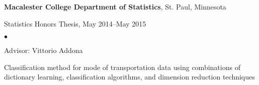\documentclass[margin,centered]{res}
\newenvironment{list1}{
  \begin{list}{\ding{113}}{%
      \setlength{\itemsep}{0in}
      \setlength{\parsep}{0in} \setlength{\parskip}{0in}
      \setlength{\topsep}{0in} \setlength{\partopsep}{0in}
      \setlength{\leftmargin}{0.17in}}}{\end{list}}
\newenvironment{list2}{
  \begin{list}{$\bullet$}{%
      \setlength{\itemsep}{0in}
      \setlength{\parsep}{0in} \setlength{\parskip}{0in}
      \setlength{\topsep}{0in} \setlength{\partopsep}{0in}
      \setlength{\leftmargin}{0.2in}}}{\end{list}}
\begin{document}
\begin{resume}
{\bf Macalester College Department of Statistics}, St. Paul, Minnesota
\begin{list1}
\item[] 
Statistics Honors Thesis, May 2014--May 2015
\begin{list2}
\vspace*{.05in}
\item
Advisor: Vittorio Addona
\item Classification method for mode of transportation data using combinations of dictionary learning, classification algorithms, and dimension reduction techniques
\end{list2} 
\end{list1}


\begin{comment}
{\bf Institute for Mathematics and Its Applications}, Minneapolis, Minnesota
\begin{list1}
\item[] 
Research Assistant, May 2014--July 2014
\begin{list2}
\vspace*{.05in}
\item
 Developed a model to automatically predict mode of transportation using smartphone sensor data
 \item Manipulated, cleaned, and visualized large time-series data sets in R
\item Contributed random forest methods of final model to Android smartphone application
 \item Presented research findings biweekly, created research poster and paper
\end{list2} 
\end{list1}


{\bf Center for Khmer Studies}, Siem Reap, Cambodia
\begin{list1}
\item[] 
Undergraduate Research Fellow, June 2013--August 2013
\begin{list2}
\vspace*{.05in}
\item Conducted a statistical analysis of price discrimination in the bargain economy of Cambodian markets
\item Took coursework in applied social science research methodology
\item Designed an experiment to test the effects of gender and ethnicity on offered prices
\item Presented results at the Center for Khmer Studies research symposium
\end{list2} 
\end{list1}


\end{comment}
\end{resume}
\end{document}
